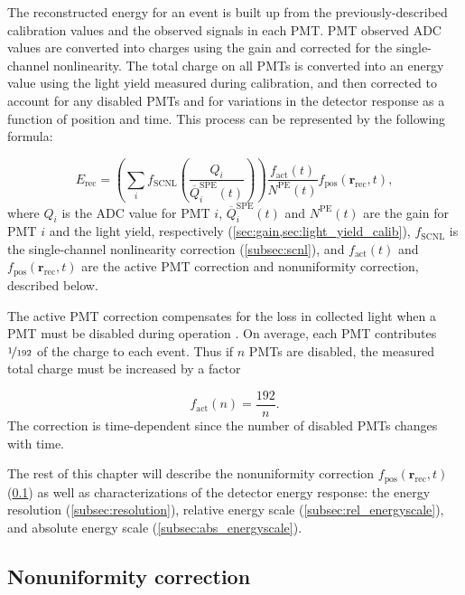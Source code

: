 The reconstructed energy for an event is built up from the previously-described
calibration values and the observed signals in each PMT.
PMT observed ADC values are converted into charges using the gain
and corrected for the single-channel nonlinearity.
The total charge on all PMTs is converted into an energy value
using the light yield measured during calibration,
and then corrected to account for any disabled PMTs
and for variations in the detector response as a function of position and time.
This process can be represented by the following formula:

\begin{equation}
    E_{\text{rec}} = \left(
        \sum_i f_{\text{SCNL}}\left(\frac{Q_i}{\overline{Q}_i^{\text{SPE}}(t)}\right)
    \right)
    \frac{f_{\text{act}}(t)}{N^{\text{PE}}(t)}
    f_{\text{pos}}(\textbf{r}_{\text{rec}},t),
\end{equation}
where $Q_i$ is the ADC value for PMT $i$,
$\overline{Q}_i^{\text{SPE}}(t)$ and $N^{\text{PE}}(t)$
are the gain for PMT $i$ and the light yield, respectively
(\cref{sec:gain,sec:light_yield_calib}),
$f_{\text{SCNL}}$ is the single-channel nonlinearity correction
(\cref{subsec:scnl}),
and $f_{\text{act}}(t)$ and $f_{\text{pos}}(\textbf{r}_{\text{rec}},t)$
are the active PMT correction and nonuniformity correction,
described below.

The active PMT correction compensates for the loss in collected light
when a PMT must be disabled during operation \cite{ngd2016}.
On average, each PMT contributes $\nicefrac{1}{192}$ of the charge to each event.
Thus if $n$ PMTs are disabled, the measured total charge must be increased by a factor

\begin{equation}
    f_{\text{act}}(n) = \frac{192}{n}.
\end{equation}
The correction is time-dependent since the number of disabled PMTs changes with time.

The rest of this chapter will describe the
nonuniformity correction $f_{\text{pos}}(\textbf{r}_{\text{rec}},t)$
(\cref{subsec:nonuniformity})
as well as characterizations of the detector energy response:
the energy resolution (\cref{subsec:resolution}),
relative energy scale (\cref{subsec:rel_energyscale}),
and absolute energy scale (\cref{subsec:abs_energyscale}).

\subsection{Nonuniformity correction}
\label{subsec:nonuniformity}

